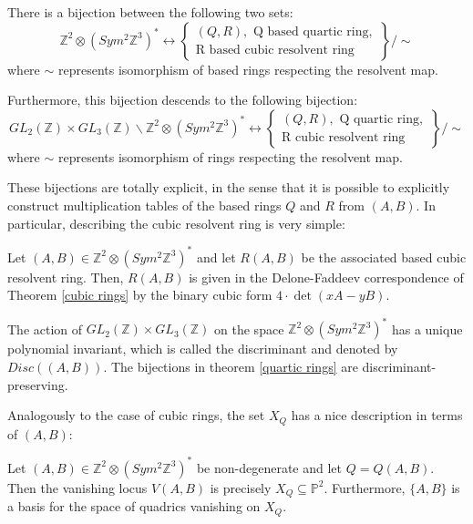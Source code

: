 \documentclass{report}
\begin{document}
\begin{theorem} \label{quartic rings}
There is a bijection between the following two sets:
\begin{equation}
\mathbb{Z}^2 \otimes (Sym^2 \mathbb{Z}^3)^* \leftrightarrow
\left \{
\begin{array}{l}
(Q,R), \text{ Q based quartic ring}, \\
\text{R based cubic resolvent ring}
\end{array}
\right \} / \sim
\end{equation}
where $\sim$ represents isomorphism of based rings respecting the resolvent map.

Furthermore, this bijection descends to the following bijection:
\begin{equation}
GL_2(\mathbb{Z}) \times GL_3(\mathbb{Z}) \backslash \mathbb{Z}^2 \otimes (Sym^2 \mathbb{Z}^3)^* \leftrightarrow
\left \{
\begin{array}{l}
(Q,R), \text{ Q quartic ring}, \\
\text{R cubic resolvent ring}
\end{array}
\right \} / \sim
\end{equation}
where $\sim$ represents isomorphism of rings respecting the resolvent map.
\end{theorem}

These bijections are totally explicit, in the sense that it is possible to explicitly construct multiplication tables of the based rings $Q$ and $R$ from $(A,B)$.  In particular, describing the cubic resolvent ring is very simple:

\begin{theorem} [Bhargava]  Let $(A,B) \in \mathbb{Z}^2 \otimes (Sym^2 \mathbb{Z}^3)^*$ and let $R(A,B)$ be the associated based cubic resolvent ring.  Then, $R(A,B)$ is given in the Delone-Faddeev correspondence of Theorem \ref{cubic rings} by the binary cubic form $4 \cdot \det(xA - yB)$.
\end{theorem}

The action of $GL_2(\mathbb{Z}) \times GL_3(\mathbb{Z})$ on the space $\mathbb{Z}^2 \otimes (Sym^2 \mathbb{Z}^3)^*$ has a unique polynomial invariant, which is called the discriminant and denoted by $Disc((A,B))$.  The bijections in theorem \ref{quartic rings} are discriminant-preserving.

Analogously to the case of cubic rings, the set $X_Q$ has a nice description in terms of $(A,B)$:
\begin{lemma} \label{X_R quartic}
Let $(A,B) \in \mathbb{Z}^2 \otimes (Sym^2 \mathbb{Z}^3)^*$ be non-degenerate and let $Q = Q(A,B)$.  Then the vanishing locus $V(A,B)$ is precisely $X_Q \subseteq \mathbb{P}^2$.  Furthermore, $\{A,B\}$ is a basis for the space of quadrics vanishing on $X_Q$.
\end{lemma}
\end{document}
